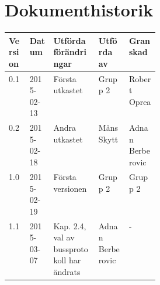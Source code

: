 \documentclass[11pt]{article}
\begin{document}
\section*{Dokumenthistorik}
\begin{table}[h]
\begin{tabular}{|l|l|p{0.3\linewidth}|l|l|} \hline

Version & 
Datum & 
Utförda förändringar & 
Utförda av & 
Granskad \\[0.1in] \hline
0.1 &
2015-02-13 & 
Första utkastet & 
Grupp 2 & 
Robert Oprea \\ \hline

0.2 &
2015-02-18 & 
Andra utkastet & 
Måns Skytt& 
Adnan Berberovic \\ \hline

1.0 &
2015-02-19 &
Första versionen &
Grupp 2 &
Grupp 2 \\ \hline

1.1 &
2015-03-07 &
Kap. 2.4, val av bussprotokoll har ändrats &
Adnan Berberovic &
- \\ \hline

\end{tabular}
\end{table}


\pagebreak

\end{document}
